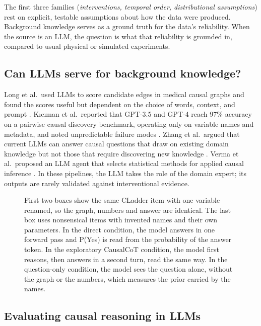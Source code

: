 \documentclass{llncs}
\begin{document}
The first three families (\emph{interventions, temporal order, distributional assumptions}) rest on explicit, testable assumptions about how the data were produced. Background knowledge serves as a ground truth for the data's reliability. When the source is an LLM, the question is what that reliability is grounded in, compared to usual physical or simulated experiments.

\subsection{Can LLMs serve for background knowledge?}
\label{sec:llm-bk}

Long et al.\ used LLMs to score candidate edges in medical causal graphs and found the scores useful but dependent on the choice of words, context, and prompt \cite{long2023can}. Kıcıman et al.\ reported that GPT-3.5 and GPT-4 reach 97\% accuracy on a pairwise causal discovery benchmark, operating only on variable names and metadata, and noted unpredictable failure modes \cite{kiciman2023causal}. Zhang et al.\ argued that current LLMs can answer causal questions that draw on existing domain knowledge but not those that require discovering new knowledge \cite{zhang2023understanding}. Verma et al.\ proposed an LLM agent that selects statistical methods for applied causal inference \cite{verma2025causal}. In these pipelines, the LLM takes the role of the domain expert; its outputs are rarely validated against interventional evidence.

\begin{figure}[t]
  \centering
  
  \caption{First two boxes show the same CLadder item with one
  variable renamed, so the graph, numbers and answer are identical.
  The last box uses nonsensical items with invented names and their own parameters.
  In the direct condition, the model answers in one forward pass and
  P(Yes) is read from the probability of the answer token. In the exploratory CausalCoT condition, the model first reasons, then answers in a second turn, read the same way. In the question-only condition, the model sees the question alone, without the graph or the numbers, which
  measures the prior carried by the names.}
  \label{fig:design}
\end{figure}

\subsection{Evaluating causal reasoning in LLMs}
\label{sec:eval}
\end{document}
